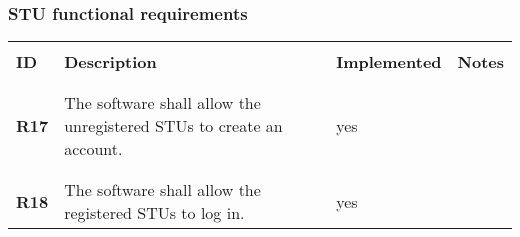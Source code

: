 \subsubsection*{STU functional requirements}

\renewcommand{\arraystretch}{0.5}
\begin{longtable}[H]{l p{6.5cm} l p{3cm}}
    \hline
                 &                                                                                                                                                                                                                       &                      &                                                                                         \\
    \textbf{ID}  & \textbf{Description}                                                                                                                                                                                                  & \textbf{Implemented} & \textbf{Notes}                                                                          \\
                 &                                                                                                                                                                                                                       &                      &                                                                                         \\\hline & & & \\
    \textbf{R17} & The software shall allow the unregistered STUs to create an account.                                                                                                                                                  & {\color{green}yes}   &                                                                                         \\
                 &                                                                                                                                                                                                                       &                      &                                                                                         \\\hline & & & \\
    \textbf{R18} & The software shall allow the registered STUs to log in.                                                                                                                                                               & {\color{green}yes}   &                                                                                         \\

\end{longtable}
